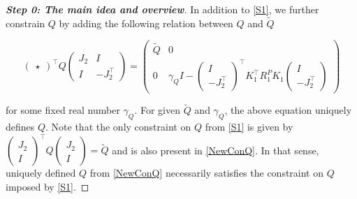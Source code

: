 \documentclass[11pt,a4paper,oneside,DIV=12,headings=small]{scrartcl}
\theoremstyle{plain}
\begin{document}
\begin{proof}[\textbf{Step 0: \textit{The main idea and overview}}]
In addition to \eqref{S1}, we further constrain $Q$ by adding the following relation between $Q$ and $\tilde{Q}$

\begin{equation}
\label{NewConQ}
\begin{pmatrix} \star\end{pmatrix}^\top 
Q
\begin{pmatrix} J_2 & I \\ I & -J_2^\top \end{pmatrix}=
\begin{pmatrix}
\tilde{Q} & 0 \\ 0 & \gamma_Q I -\begin{pmatrix} I \\ -J_2^\top \end{pmatrix}^\top K_1^\top R_1^P K_1 \begin{pmatrix} I \\ -J_2^\top \end{pmatrix} 
\end{pmatrix}
\end{equation}

for some fixed real number $\gamma_Q$. For given $\tilde{Q}$ and $\gamma_Q$, the above equation uniquely defines $Q$. Note that the only constraint on $Q$ from \eqref{S1} is given by 
$\left(\begin{smallmatrix}J_2 \\ I \end{smallmatrix}\right)^\top Q \left(\begin{smallmatrix}J_2 \\ I \end{smallmatrix}\right) =\tilde{Q}$
and is also present in \eqref{NewConQ}. In that sense, uniquely defined $Q$ from \eqref{NewConQ} necessarily satisfies the constraint on $Q$ imposed by \eqref{S1}. 


\end{proof}
\end{document}

